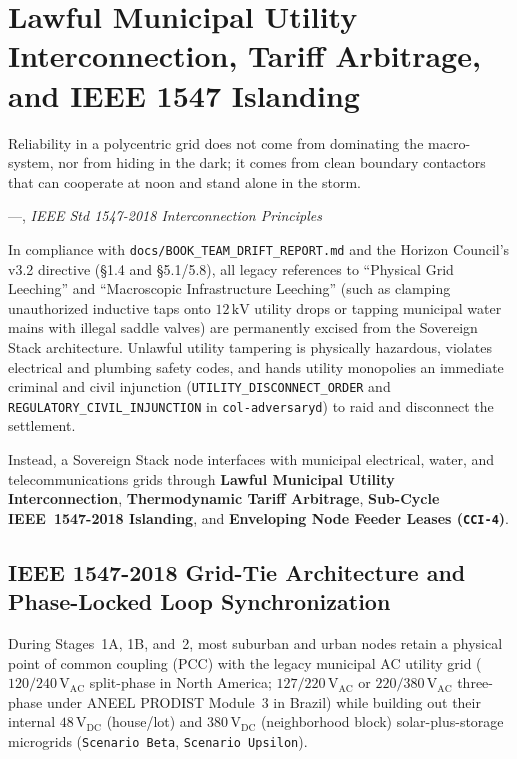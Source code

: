 \chapter{Lawful Municipal Utility Interconnection, Tariff Arbitrage, and IEEE 1547 Islanding}
\label{ch:l7-utility-interconnection}

\epigraph{Reliability in a polycentric grid does not come from dominating the macro-system, nor from hiding in the dark; it comes from clean boundary contactors that can cooperate at noon and stand alone in the storm.}{---\textcite{ieee1547}, \textit{IEEE Std 1547-2018 Interconnection Principles}}

In compliance with \texttt{docs/BOOK\_TEAM\_DRIFT\_REPORT.md} and the Horizon Council's v3.2 directive (\S 1.4 and \S 5.1/5.8), all legacy references to ``Physical Grid Leeching'' and ``Macroscopic Infrastructure Leeching'' (such as clamping unauthorized inductive taps onto $12\,\mathrm{kV}$ utility drops or tapping municipal water mains with illegal saddle valves) are permanently excised from the Sovereign Stack architecture. Unlawful utility tampering is physically hazardous, violates electrical and plumbing safety codes, and hands utility monopolies an immediate criminal and civil injunction (\texttt{UTILITY\_DISCONNECT\_ORDER} and \texttt{REGULATORY\_CIVIL\_INJUNCTION} in \texttt{col-adversaryd}) to raid and disconnect the settlement.

Instead, a Sovereign Stack node interfaces with municipal electrical, water, and telecommunications grids through \textbf{Lawful Municipal Utility Interconnection}, \textbf{Thermodynamic Tariff Arbitrage}, \textbf{Sub-Cycle IEEE~1547-2018 Islanding}, and \textbf{Enveloping Node Feeder Leases (\texttt{CCI-4})}.

\section{IEEE 1547-2018 Grid-Tie Architecture and Phase-Locked Loop Synchronization}
\label{sec:l7-ieee1547-pll}

During Stages~1A, 1B, and~2, most suburban and urban nodes retain a physical point of common coupling (PCC) with the legacy municipal AC utility grid ($120/240\,\mathrm{V}_{\mathrm{AC}}$ split-phase in North America; $127/220\,\mathrm{V}_{\mathrm{AC}}$ or $220/380\,\mathrm{V}_{\mathrm{AC}}$ three-phase under ANEEL PRODIST Module~3 in Brazil) while building out their internal $48\,\mathrm{V}_{\mathrm{DC}}$ (house/lot) and $380\,\mathrm{V}_{\mathrm{DC}}$ (neighborhood block) solar-plus-storage microgrids (\texttt{Scenario Beta}, \texttt{Scenario Upsilon}).


